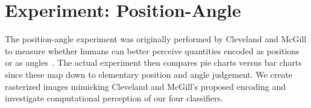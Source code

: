 
\section{Experiment: Position-Angle}

The position-angle experiment was originally performed by Cleveland and McGill to measure whether humans can better perceive quantities encoded as positions or as angles~\cite{cleveland_mcgill}. The actual experiment then compares pie charts versus bar charts since these map down to elementary position and angle judgement. We create rasterized images mimicking Cleveland and McGill's proposed encoding and investigate computational perception of our four classifiers.

\begin{table}[h]
\centering
\caption{\textbf{Position-Angle Experiment.} We create rasterized visualizations of pie charts and bar charts to follow Cleveland and McGill's position-angle experiment. The experimental task involves the judgement of different encoded values in comparison to the largest encoded values. The pie chart and the bar chart visualize the same data point. In their paper, Cleveland and McGill report less errors using bar charts.}
\label{tab:pos_angle_parameters}
\end{table}

